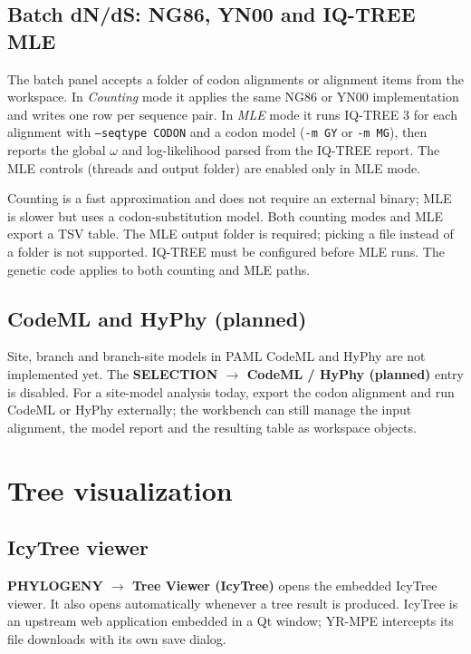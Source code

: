 \documentclass[10pt]{report}
\begin{document}
\section{Batch dN/dS: NG86, YN00 and IQ-TREE MLE}

The batch panel accepts a folder of codon alignments or alignment items from
the workspace. In \emph{Counting} mode it applies the same NG86 or YN00
implementation and writes one row per sequence pair. In \emph{MLE} mode it runs
IQ-TREE 3 for each alignment with \texttt{--seqtype CODON} and a codon model
(\texttt{-m GY} or \texttt{-m MG}), then reports the global $\omega$ and
log-likelihood parsed from the IQ-TREE report. The MLE controls (threads and
output folder) are enabled only in MLE mode.

Counting is a fast approximation and does not require an external binary; MLE
is slower but uses a codon-substitution model. Both counting modes and MLE
export a TSV table. The MLE output folder is required; picking a file instead
of a folder is not supported. IQ-TREE must be configured before MLE runs. The
genetic code applies to both counting and MLE paths.

\section{CodeML and HyPhy (planned)}

Site, branch and branch-site models in PAML CodeML \cite{paml} and HyPhy
\cite{hyphy} are not implemented yet. The \textbf{SELECTION $\rightarrow$ CodeML / HyPhy (planned)}
entry is disabled. For a site-model analysis today, export the codon alignment
and run CodeML or HyPhy externally; the workbench can still manage the input
alignment, the model report and the resulting table as workspace objects.

\chapter{Tree visualization}

\section{IcyTree viewer}

\textbf{PHYLOGENY $\rightarrow$ Tree Viewer (IcyTree)} opens the embedded
IcyTree viewer. It also opens automatically whenever a tree result is produced.
IcyTree is an upstream web application embedded in a Qt window; YR-MPE
intercepts its file downloads with its own save dialog.
\end{document}
